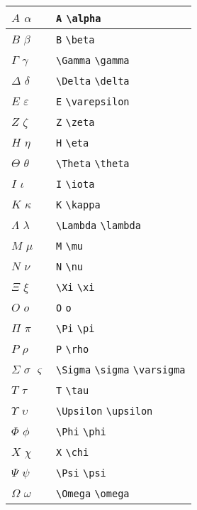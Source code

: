 \documentclass{article}
\begin{document}
\begin{center}
\begin{tabular}{ | l | l | }
	\hline
	$A$ $\alpha$          & \verb|A| \verb|\alpha|          \\ \hline  %
	$B$ $\beta$           & \verb|B| \verb|\beta|           \\ \hline  %
	$\Gamma$ $\gamma$     & \verb|\Gamma| \verb|\gamma|     \\ \hline  %
	$\Delta$ $\delta$     & \verb|\Delta| \verb|\delta|     \\ \hline  %
	$E$ $\varepsilon$     & \verb|E| \verb|\varepsilon|     \\ \hline  %
	$Z$ $\zeta$           & \verb|Z| \verb|\zeta|           \\ \hline  %
	$H$ $\eta$            & \verb|H| \verb|\eta|            \\ \hline  %
	$\Theta$ $\theta$     & \verb|\Theta| \verb|\theta|     \\ \hline  %
	$I$ $\iota$           & \verb|I| \verb|\iota|           \\ \hline  %
	$K$ $\kappa$          & \verb|K| \verb|\kappa|          \\ \hline  %
	$\Lambda$ $\lambda$   & \verb|\Lambda| \verb|\lambda|   \\ \hline  %
	$M$ $\mu$             & \verb|M| \verb|\mu|             \\ \hline  %
	$N$ $\nu$             & \verb|N| \verb|\nu|             \\ \hline  %
	$\Xi$ $\xi$           & \verb|\Xi| \verb|\xi|           \\ \hline  %
	$O$ $o$               & \verb|O| \verb|o|               \\ \hline  %
	$\Pi$ $\pi$           & \verb|\Pi| \verb|\pi|           \\ \hline  %
	$P$ $\rho$            & \verb|P| \verb|\rho|            \\ \hline  %
	$\Sigma$ $\sigma$ $\varsigma$ & \verb|\Sigma| \verb|\sigma| \verb|\varsigma| \\ \hline  %
	$T$ $\tau$            & \verb|T| \verb|\tau|            \\ \hline  %
	$\Upsilon$ $\upsilon$ & \verb|\Upsilon| \verb|\upsilon| \\ \hline  %
	$\Phi$ $\phi$         & \verb|\Phi| \verb|\phi|         \\ \hline  %
	$X$ $\chi$            & \verb|X| \verb|\chi|            \\ \hline  %
	$\Psi$ $\psi$         & \verb|\Psi| \verb|\psi|         \\ \hline  %
	$\Omega$ $\omega$     & \verb|\Omega| \verb|\omega|     \\ \hline  %
\end{tabular}
\end{center}
\end{document}
